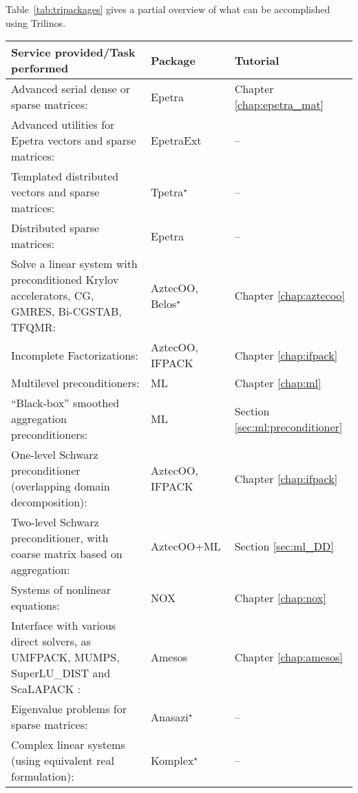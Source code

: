 Table~\ref{tab:tripackages} gives a partial overview of what can be
accomplished using Trilinos.
\begin{table}[htbp]
  \centering
  \begin{tabular}{| p{8cm} | p{2.5cm} | p{3cm} |}
    \hline
    {\bf Service provided/Task performed} & {\bf Package} & {\bf Tutorial}\\
    \hline
    \hline
    Advanced serial dense or sparse matrices: & Epetra 
    & Chapter \ref{chap:epetra_mat} \\
    Advanced utilities for Epetra vectors and sparse matrices: &
    EpetraExt & --  
    \\
    \hline
    Templated distributed vectors and sparse matrices: & Tpetra$^\star$
    & -- \\
    \hline
    Distributed sparse matrices:& Epetra & -- \\
    \hline
    Solve a linear system with preconditioned Krylov accelerators, 
    CG, GMRES, Bi-CGSTAB, TFQMR:& AztecOO, Belos$^\star$ &
    Chapter \ref{chap:aztecoo} \\
    \hline
    Incomplete Factorizations:& AztecOO, \newline IFPACK &
    Chapter \ref{chap:ifpack} \\
    \hline
    Multilevel  preconditioners: & ML & Chapter \ref{chap:ml} \\
    \hline
    ``Black-box'' smoothed aggregation preconditioners:& ML & Section
    \ref{sec:ml:preconditioner} \\
    \hline
    One-level Schwarz preconditioner (overlapping domain
    decomposition):& AztecOO, \newline IFPACK & Chapter
    \ref{chap:ifpack} \\
    \hline
    Two-level Schwarz preconditioner, with coarse matrix based on
    aggregation:& AztecOO+ML & Section \ref{sec:ml_DD} \\
    \hline
    Systems of nonlinear equations:& NOX & Chapter \ref{chap:nox} \\
    \hline
    Interface with various direct solvers, as UMFPACK, MUMPS, SuperLU\_DIST
    and ScaLAPACK :& Amesos & Chapter \ref{chap:amesos} \\
    \hline
    Eigenvalue problems for sparse matrices:& Anasazi$^\star$ &
--
    \\
    \hline
    Complex linear systems (using equivalent real formulation):&
    Komplex$^\star$ & -- \\
    \hline

\end{tabular}
\end{table}
